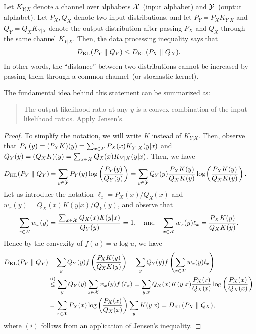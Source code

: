 \documentclass[12pt]{article}
\begin{document}
\begin{theorem}
\label{theorem:DPI}  Let $K_{Y|X}$ denote a channel over alphabets ${\cal X}$~(input alphabet) and ${\cal Y}$~(ouptut alphabet). Let $P_X, Q_X$ denote two input distributions, and let $P_Y = P_X K_{Y|X} $ and $Q_Y = Q_X K_{Y|X}$ denote the output distribution after passing $P_X$ and $Q_X$ through the same channel $K_{Y|X}$. Then, the data processing inequality says that 
\begin{align}
D_{\text{KL}}(P_Y \parallel Q_Y) \leq D_{\text{KL}}(P_X\parallel Q_X). 
\end{align}
In other words, the ``distance'' between two distributions cannot be increased by passing them through a common channel~(or stochastic kernel). 
\end{theorem}
The fundamental idea behind this statement can be summarized as: \begin{quote}
	The output likelihood ratio at any $y$ is a convex combination of the input likelihood ratios. Apply Jensen's.
\end{quote}

\begin{proof}
To simplify the notation, we will write $K$ instead of $K_{Y|X}$. Then, observe that $P_Y(y) = (P_X K)(y) = \sum_{x \in {\cal X}} P_X(x) K_{Y|X}(y|x)$ and $Q_Y(y) = (Q_X K)(y) = \sum_{x \in {\cal X}} Q_X(x) K_{Y|X}(y|x)$. Then, we have 
\begin{align}
D_{\text{KL}}(P_Y \parallel Q_Y) &= \sum_{y\in {\cal Y}} P_Y(y) \log \left( \frac{P_Y(y)}{Q_Y(y)} \right) = \sum_{y\in {\cal Y}} Q_Y(y)  \frac{P_X K(y)}{Q_X K(y)}\log \left( \frac{P_X K(y)}{Q_XK(y)} \right). 
\end{align}
Let us introduce the notation $\ell_x = P_X(x)/Q_X(x)$ and  $w_x(y)= Q_X(x) K(y|x)/Q_Y(y)$, and observe that 
\begin{align}
\sum_{x \in {\cal X}} w_x(y) = \frac{\sum_{x \in {\cal X}} Q_X(x) K(y|x) }{Q_Y(y)} = 1,  \quad \text{and} \quad 
\sum_{x \in {\cal X}} w_x(y) \ell_x = \frac{P_X K(y)}{Q_X K(y)}. 
\end{align}
Hence by the convexity of $f(u) =  u \log u$, we have 
\begin{align}
D_{\text{KL}}(P_Y \parallel Q_Y) &= \sum_{y} Q_Y(y) f\left( \frac{P_X K(y)}{Q_X K(y)} \right) = \sum_y Q_Y(y) f \left( \sum_{x \in {\cal X}} w_x(y) \ell_x \right) \\
& \stackrel{(i)}{\leq} \sum_{y} Q_Y(y) \sum_{x \in {\cal X}} w_x(y) f\left(  \ell_x\right)  = \sum_{y, x} Q_X(x) K(y|x) \frac{P_X(x)}{Q_X(x)} \log \left( \frac{P_X(x)}{Q_X(x)} \right) \\
& = \sum_{x \in {\cal X}} P_X(x) \log \left( \frac{P_X(x)}{Q_X(x)} \right) \sum_{y} K(y|x) 
=D_{\text{KL}}(P_X \parallel Q_X), 
\end{align}
where $(i)$ follows from an application of Jensen's inequality. 
\end{proof}
\end{document}
